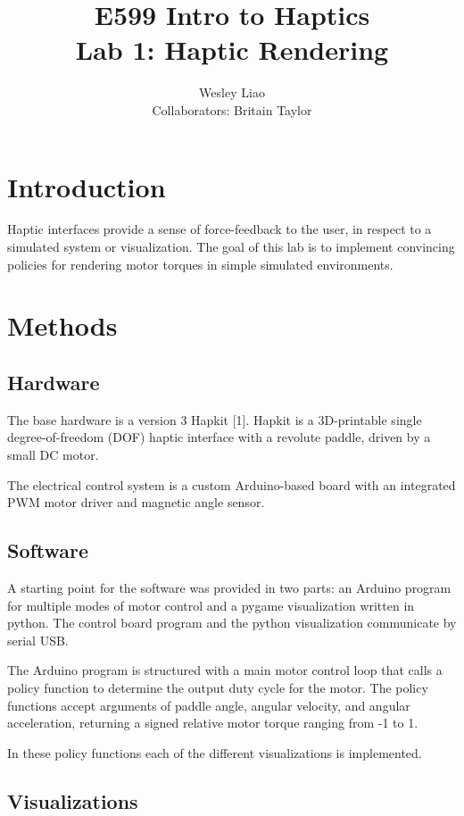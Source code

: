 \documentclass{article}
\title{E599 Intro to Haptics\\Lab 1: Haptic Rendering}
\author{Wesley Liao\\Collaborators: Britain Taylor}
\begin{document}
\maketitle

\section{Introduction}

Haptic interfaces provide a sense of force-feedback to the user, in respect to a
simulated system or visualization.
The goal of this lab is to implement convincing policies for rendering motor torques in
simple simulated environments.

\section{Methods}

\subsection{Hardware}

  The base hardware is a version 3 Hapkit [1].
  Hapkit is a 3D-printable single degree-of-freedom (DOF) haptic interface with a
  revolute paddle, driven by a small DC motor.

  The electrical control system is a custom Arduino-based board with an
  integrated PWM motor driver and magnetic angle sensor.

\subsection{Software}

  A starting point for the software was provided in two parts:
  an Arduino program for multiple modes of motor control and
  a pygame visualization written in python.
  The control board program and the python visualization communicate by serial USB.

  The Arduino program is structured with a main motor control loop that calls a
  policy function to determine the output duty cycle for the motor.
  The policy functions accept arguments of paddle angle, angular velocity, and
  angular acceleration, returning a signed relative motor torque ranging from -1 to 1.

  In these policy functions each of the different visualizations is implemented.

\subsection{Visualizations}
\end{document}
